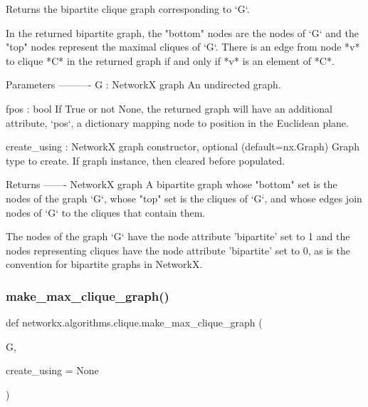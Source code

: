 \begin{DoxyVerb}Returns the bipartite clique graph corresponding to `G`.

In the returned bipartite graph, the "bottom" nodes are the nodes of
`G` and the "top" nodes represent the maximal cliques of `G`.
There is an edge from node *v* to clique *C* in the returned graph
if and only if *v* is an element of *C*.

Parameters
----------
G : NetworkX graph
    An undirected graph.

fpos : bool
    If True or not None, the returned graph will have an
    additional attribute, `pos`, a dictionary mapping node to
    position in the Euclidean plane.

create_using : NetworkX graph constructor, optional (default=nx.Graph)
   Graph type to create. If graph instance, then cleared before populated.

Returns
-------
NetworkX graph
    A bipartite graph whose "bottom" set is the nodes of the graph
    `G`, whose "top" set is the cliques of `G`, and whose edges
    join nodes of `G` to the cliques that contain them.

    The nodes of the graph `G` have the node attribute
    'bipartite' set to 1 and the nodes representing cliques
    have the node attribute 'bipartite' set to 0, as is the
    convention for bipartite graphs in NetworkX.\end{DoxyVerb}
 \mbox{\label{namespacenetworkx_1_1algorithms_1_1clique_aac9c1881d34c45c7cfcae3ad3e2f14b2}} 
\subsubsection{\texorpdfstring{make\+\_\+max\+\_\+clique\+\_\+graph()}{make\_max\_clique\_graph()}}
{\footnotesize\ttfamily def networkx.\+algorithms.\+clique.\+make\+\_\+max\+\_\+clique\+\_\+graph (\begin{DoxyParamCaption}\item[{}]{G,  }\item[{}]{create\+\_\+using = {\ttfamily None} }\end{DoxyParamCaption})}

